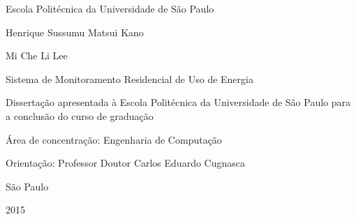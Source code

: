 \begin{titlepage}

\begin{center}
Escola Politécnica da Universidade de São Paulo

Henrique Sussumu Matsui Kano

Mi Che Li Lee

\vspace{90mm}
Sistema de Monitoramento Residencial de Uso de Energia
\end{center}

\vspace{20mm}
\large
\hspace{60mm}
\begin{minipage}{18em}
	Dissertação apresentada à Escola Politécnica da Universidade de São Paulo para a conclusão do curso de graduação
\end{minipage}

\hspace{60mm}\begin{minipage}{18em}
Área de concentração: Engenharia de Computação
\end{minipage}

\large
\hspace{60mm}\begin{minipage}{18em}
Orientação: Professor Doutor Carlos Eduardo Cugnasca
\end{minipage}

\begin{center}
\vfill
São Paulo

2015

\end{center}

\end{titlepage}

